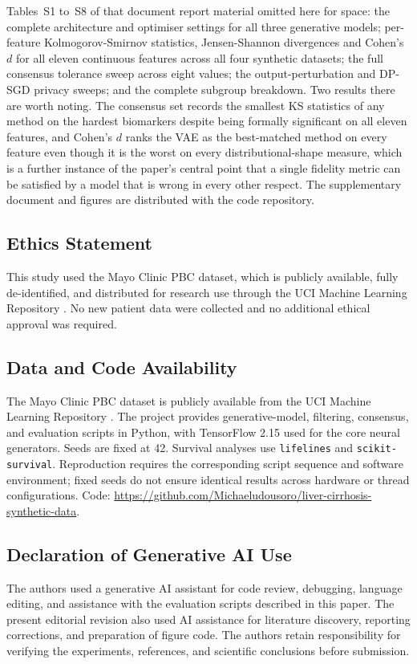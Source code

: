 \documentclass[journal]{IEEEtran}
\begin{document}
Tables~S1 to~S8 of that document report material omitted here for space: the complete architecture and optimiser settings for all three generative models; per-feature Kolmogorov-Smirnov statistics, Jensen-Shannon divergences and Cohen's $d$ for all eleven continuous features across all four synthetic datasets; the full consensus tolerance sweep across eight values; the output-perturbation and DP-SGD privacy sweeps; and the complete subgroup breakdown. Two results there are worth noting. The consensus set records the smallest KS statistics of any method on the hardest biomarkers despite being formally significant on all eleven features, and Cohen's $d$ ranks the VAE as the best-matched method on every feature even though it is the worst on every distributional-shape measure, which is a further instance of the paper's central point that a single fidelity metric can be satisfied by a model that is wrong in every other respect. The supplementary document and figures are distributed with the code repository.

\subsection*{Ethics Statement}
This study used the Mayo Clinic PBC dataset, which is publicly available, fully de-identified, and distributed for research use through the UCI Machine Learning Repository \cite{ucipbc}. No new patient data were collected and no additional ethical approval was required.

\subsection*{Data and Code Availability}
The Mayo Clinic PBC dataset is publicly available from the UCI Machine Learning Repository \cite{ucipbc}. The project provides generative-model, filtering, consensus, and evaluation scripts in Python, with TensorFlow 2.15 used for the core neural generators. Seeds are fixed at 42. Survival analyses use \texttt{lifelines} and \texttt{scikit-survival}. Reproduction requires the corresponding script sequence and software environment; fixed seeds do not ensure identical results across hardware or thread configurations. Code: \url{https://github.com/Michaeludousoro/liver-cirrhosis-synthetic-data}.

\subsection*{Declaration of Generative AI Use}
The authors used a generative AI assistant for code review, debugging, language editing, and assistance with the evaluation scripts described in this paper. The present editorial revision also used AI assistance for literature discovery, reporting corrections, and preparation of figure code. The authors retain responsibility for verifying the experiments, references, and scientific conclusions before submission.
\end{document}
